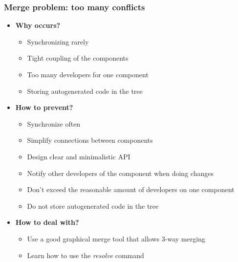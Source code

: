 \documentclass{beamer}
\begin{document}
\begin{frame}
\frametitle{Merge problem: too many conflicts}
\begin{itemize}
\item \textbf{Why occurs?}
\begin{itemize}
\item Synchronizing rarely
\item Tight coupling of the components
\item Too many developers for one component
\item Storing autogenerated code in the tree
\end{itemize}
\item \textbf{How to prevent?}
\begin{itemize}
\item Synchronize often
\item Simplify connections between components
\item Design clear and minimalistic API
\item Notify other developers of the component when doing changes
\item Don't exceed the reasonable amount of developers on one component 
\item Do not store autogenerated code in the tree
\end{itemize}
\item \textbf{How to deal with?}
\begin{itemize}
\item Use a good graphical merge tool that allows 3-way merging
\item Learn how to use the \textit{resolve} command
\end{itemize}
\end{itemize}
\end{frame}
\end{document}
